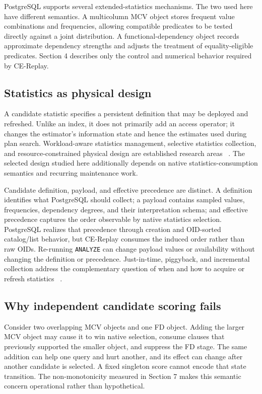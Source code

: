 \documentclass[sigconf,nonacm]{acmart}
\begin{document}
PostgreSQL supports several extended-statistics mechanisms. The two used here have different semantics. A multicolumn MCV object stores frequent value combinations and frequencies, allowing compatible predicates to be tested directly against a joint distribution. A functional-dependency object records approximate dependency strengths and adjusts the treatment of equality-eligible predicates. Section 4 describes only the control and numerical behavior required by CE-Replay.

\subsection{Statistics as physical design}

A candidate statistic specifies a persistent definition that may be deployed and refreshed. Unlike an index, it does not primarily add an access operator; it changes the estimator's information state and hence the estimates used during plan search. Workload-aware statistics management, selective statistics collection, and resource-constrained physical design are established research areas ~\cite{chaudhuri2001statistics,elhelw2007jits,bruno2008constrained}. The selected design studied here additionally depends on native statistics-consumption semantics and recurring maintenance work.

Candidate definition, payload, and effective precedence are distinct. A definition identifies what PostgreSQL should collect; a payload contains sampled values, frequencies, dependency degrees, and their interpretation schema; and effective precedence captures the order observable by native statistics selection. PostgreSQL realizes that precedence through creation and OID-sorted catalog/list behavior, but CE-Replay consumes the induced order rather than raw OIDs. Re-running \texttt{ANALYZE} can change payload values or availability without changing the definition or precedence. Just-in-time, piggyback, and incremental collection address the complementary question of when and how to acquire or refresh statistics ~\cite{elhelw2007jits,zhu2004piggyback,pfeil2026redshift}.

\subsection{Why independent candidate scoring fails}

Consider two overlapping MCV objects and one FD object. Adding the larger MCV object may cause it to win native selection, consume clauses that previously supported the smaller object, and suppress the FD stage. The same addition can help one query and hurt another, and its effect can change after another candidate is selected. A fixed singleton score cannot encode that state transition. The non-monotonicity measured in Section 7 makes this semantic concern operational rather than hypothetical.
\end{document}
